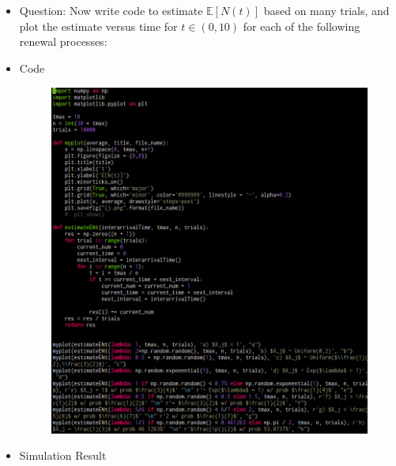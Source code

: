 \documentclass[a4paper]{article}
\begin{document}
\section{}
\begin{itemize}
    \item Question: Now write code to estimate $\mathbb{E}[N(t)]$ based on many trials, and plot the estimate versus time for $t \in (0, 10)$ for each of the following renewal processes:
    \item Code
        \begin{figure} [H]
            \includegraphics[width=1\linewidth]{src/code.png}
        \end{figure}
    \item Simulation Result
        \begin{figure} [t]
            \begin{subfigure}[b]{0.45\textwidth}

\end{subfigure}
\end{figure}
\end{itemize}
\end{document}
